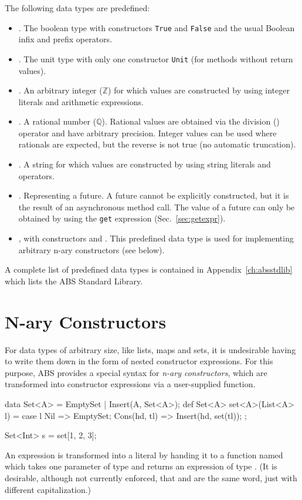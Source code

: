 The following data types are predefined:
\begin{itemize}
\item {}. The boolean type with constructors \texttt{True} and \texttt{False} and the usual Boolean infix and prefix operators.
\item {}. The unit type with only one constructor \texttt{Unit} (for methods without return values).
\item {}. An arbitrary integer ($\mathbb{Z}$) for which values are constructed by using integer literals and arithmetic expressions.
\item {}. A rational number ($\mathbb{Q}$).  Rational values are obtained via the division (\absinline{/}) operator and have arbitrary precision.  Integer values can be used where rationals are expected, but the reverse is not true (no automatic truncation).
\item {}. A string for which values are constructed by using string literals and operators.
\item {}. Representing a future. A future cannot be explicitly constructed, but it is the result of an asynchronous method call. The value of a future can only be obtained by using the \texttt{get} expression (Sec.~\ref{sec:getexpr}).
\item {}, with constructors  and
  .  This predefined data type is used
  for implementing arbitrary n-ary constructors (see below).
\end{itemize}

A complete list of predefined data types is contained in
Appendix~\ref{ch:absstdlib} which lists the ABS Standard Library.

\section{N-ary Constructors}
\label{sec:n-ary-constructors}

For data types of arbitrary size, like lists, maps and sets, it is
undesirable having to write them down in the form of nested constructor
expressions.  For this purpose, ABS provides a special syntax for
\emph{n-ary constructors}, which are transformed into constructor
expressions via a user-supplied function.

\begin{absexample}
data Set<A> = EmptySet | Insert(A, Set<A>);
def Set<A> set<A>(List<A> l) = 
   case l {
      Nil => EmptySet;
      Cons(hd, tl) => Insert(hd, set(tl));
   } ;

{
  Set<Int> s = set[1, 2, 3];
}
\end{absexample}
An expression  is transformed into a literal by
handing it to a function named  which takes one parameter of
type  and returns an expression of type .  (It is
desirable, although not currently enforced, that  and
 are the same word, just with different capitalization.)

